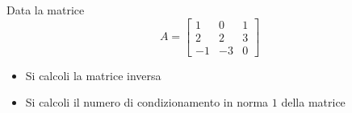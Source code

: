 Data la matrice
\bigskip
\[
A=\left[
\begin{array}{ccc}
1 & 0 & 1 \\
2 & 2 & 3\\
-1 & -3 & 0
\end{array}\right]
\]
\begin{itemize}
\item
Si calcoli la matrice inversa
\item
Si calcoli il numero di condizionamento in norma $1$ della matrice
\end{itemize}
